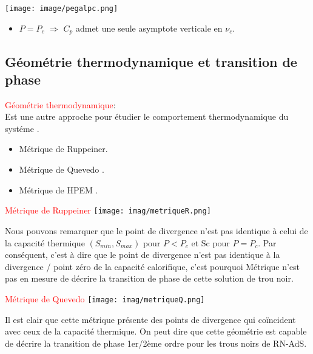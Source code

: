 \documentclass{beamer}
\begin{document}
\begin{frame}
	\texttt{[image: image/pegalpc.png]}
\begin{itemize}
\item $P=P_{c} $ $\Rightarrow$ $C_{p}$  admet une seule asymptote verticale en $\nu_{c}$.
\end{itemize}
\end{frame}
\subsection{Géométrie thermodynamique et transition de phase}
\begin{frame}
\textcolor{red}{Géométrie thermodynamique}:\\
Est une autre approche pour étudier le comportement thermodynamique
du systéme .  
\begin{itemize}
\item Métrique de Ruppeiner.
\item Métrique de Quevedo .
\item Métrique de HPEM .
\end{itemize}

\end{frame}
\begin{frame}
\textcolor{red}{Métrique de Ruppeiner}
	\texttt{[image: imag/metriqueR.png]}

\begin{block}{}
Nous pouvons remarquer que le point de divergence n’est pas identique à celui de la
capacité thermique $(S_{min}, S_{max})$ pour $P < P_{c}$ et Sc pour $ P = P_{c}$. Par conséquent,
c'est à dire 
que le point de divergence n'est pas identique à la divergence / point zéro de la capacité calorifique, c'est pourquoi
Métrique n'est pas en mesure de décrire la transition de phase de cette solution de trou noir.
\end{block}
\end{frame}

\begin{frame}
\textcolor{red}{Métrique de Quevedo}
\texttt{[image: imag/metriqueQ.png]}

\begin{block}{}
	Il est clair que cette métrique présente des points de divergence qui coïncident avec
	ceux de la capacité thermique. On peut dire que cette géométrie est capable de décrire la
	transition de phase 1er/2ème ordre pour les trous noirs de RN-AdS.
\end{block}
\end{frame}
\end{document}
